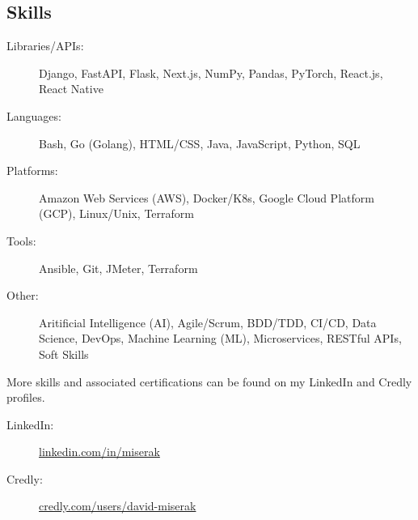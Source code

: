\begin{samepage}
\section{Skills}

\begin{description}
	\item[Libraries/APIs:]
		Django,
		FastAPI,
		Flask,
		Next.js,
		NumPy,
		Pandas,
		PyTorch,
		React.js,
		React Native
	\item[Languages:]
		Bash,
		Go (Golang),
		HTML/CSS,
		Java,
		JavaScript,
		Python,
		SQL
	\item[Platforms:]
		Amazon Web Services (AWS),
		Docker/K8s,
		Google Cloud Platform (GCP),
		Linux/Unix,
		Terraform
	\item[Tools:]
		Ansible,
		Git,
		JMeter,
		Terraform

	\item[Other:]
		Aritificial Intelligence (AI),
		Agile/Scrum,
		BDD/TDD,
		CI/CD,
		Data Science,
		DevOps,
		Machine Learning (ML),
		Microservices,
		RESTful APIs,
		Soft Skills\\
\end{description}
%
	More skills and associated certifications can be found on my LinkedIn and Credly profiles.
\begin{description}
	\item[LinkedIn:] \href{https://www.linkedin.com/in/miserak/}{linkedin.com/in/miserak}
	\item[Credly:] \href{https://www.credly.com/users/david-miserak}{credly.com/users/david-miserak}
\end{description}
\end{samepage}
